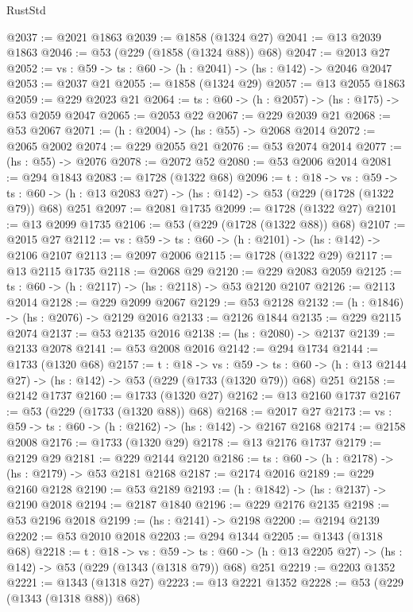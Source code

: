 \begin{lexlean}{RustStd}
\begin{coremodule}
@2037 := @2021 @1863
@2039 := @1858 (@1324 @27)
@2041 := @13 @2039 @1863
@2046 := @53 (@229 (@1858 (@1324 @88)) @68)
@2047 := @2013 @27
@2052 := {vs : @59} -> {ts : @60} -> (h : @2041) -> (hs : @142) -> @2046 @2047
@2053 := @2037 @21
@2055 := @1858 (@1324 @29)
@2057 := @13 @2055 @1863
@2059 := @229 @2023 @21
@2064 := {ts : @60} -> (h : @2057) -> (hs : @175) -> @53 @2059 @2047
@2065 := @2053 @22
@2067 := @229 @2039 @21
@2068 := @53 @2067
@2071 := (h : @2004) -> (hs : @55) -> @2068 @2014
@2072 := @2065 @2002
@2074 := @229 @2055 @21
@2076 := @53 @2074 @2014
@2077 := (hs : @55) -> @2076
@2078 := @2072 @52
@2080 := @53 @2006 @2014
@2081 := @294 @1843
@2083 := @1728 (@1322 @68)
@2096 := {t : @18} ->
  {vs : @59} ->
  {ts : @60} -> (h : @13 @2083 @27) -> (hs : @142) -> @53 (@229 (@1728 (@1322 @79)) @68) @251
@2097 := @2081 @1735
@2099 := @1728 (@1322 @27)
@2101 := @13 @2099 @1735
@2106 := @53 (@229 (@1728 (@1322 @88)) @68)
@2107 := @2015 @27
@2112 := {vs : @59} -> {ts : @60} -> (h : @2101) -> (hs : @142) -> @2106 @2107
@2113 := @2097 @2006
@2115 := @1728 (@1322 @29)
@2117 := @13 @2115 @1735
@2118 := @2068 @29
@2120 := @229 @2083 @2059
@2125 := {ts : @60} -> (h : @2117) -> (hs : @2118) -> @53 @2120 @2107
@2126 := @2113 @2014
@2128 := @229 @2099 @2067
@2129 := @53 @2128
@2132 := (h : @1846) -> (hs : @2076) -> @2129 @2016
@2133 := @2126 @1844
@2135 := @229 @2115 @2074
@2137 := @53 @2135 @2016
@2138 := (hs : @2080) -> @2137
@2139 := @2133 @2078
@2141 := @53 @2008 @2016
@2142 := @294 @1734
@2144 := @1733 (@1320 @68)
@2157 := {t : @18} ->
  {vs : @59} ->
  {ts : @60} -> (h : @13 @2144 @27) -> (hs : @142) -> @53 (@229 (@1733 (@1320 @79)) @68) @251
@2158 := @2142 @1737
@2160 := @1733 (@1320 @27)
@2162 := @13 @2160 @1737
@2167 := @53 (@229 (@1733 (@1320 @88)) @68)
@2168 := @2017 @27
@2173 := {vs : @59} -> {ts : @60} -> (h : @2162) -> (hs : @142) -> @2167 @2168
@2174 := @2158 @2008
@2176 := @1733 (@1320 @29)
@2178 := @13 @2176 @1737
@2179 := @2129 @29
@2181 := @229 @2144 @2120
@2186 := {ts : @60} -> (h : @2178) -> (hs : @2179) -> @53 @2181 @2168
@2187 := @2174 @2016
@2189 := @229 @2160 @2128
@2190 := @53 @2189
@2193 := (h : @1842) -> (hs : @2137) -> @2190 @2018
@2194 := @2187 @1840
@2196 := @229 @2176 @2135
@2198 := @53 @2196 @2018
@2199 := (hs : @2141) -> @2198
@2200 := @2194 @2139
@2202 := @53 @2010 @2018
@2203 := @294 @1344
@2205 := @1343 (@1318 @68)
@2218 := {t : @18} ->
  {vs : @59} ->
  {ts : @60} -> (h : @13 @2205 @27) -> (hs : @142) -> @53 (@229 (@1343 (@1318 @79)) @68) @251
@2219 := @2203 @1352
@2221 := @1343 (@1318 @27)
@2223 := @13 @2221 @1352
@2228 := @53 (@229 (@1343 (@1318 @88)) @68)

\end{coremodule}
\end{lexlean}
